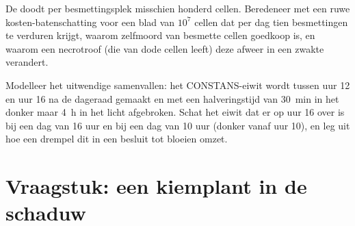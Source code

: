\begin{exercise}[$\star\star\star$]\label{exo:b3:plant-molecular-physiology:11}
De  doodt per besmettingsplek misschien honderd
cellen. Beredeneer met een ruwe kosten-batenschatting voor een blad van
$10^{7}$ cellen dat per dag tien besmettingen te verduren krijgt,
waarom zelfmoord van besmette cellen goedkoop is, en waarom een
necrotroof (die van dode cellen leeft) deze afweer in een zwakte
verandert.
\end{exercise}

\begin{exercise}[$\star\star\star$]\label{exo:b3:plant-molecular-physiology:12}
Modelleer het uitwendige samenvallen: het CONSTANS-eiwit wordt tussen
uur 12 en uur 16 na de dageraad gemaakt en met een halveringstijd van
\qty{30}{min} in het donker maar \qty{4}{h} in het licht afgebroken.
Schat het eiwit dat er op uur 16 over is bij een dag van 16 uur en bij
een dag van 10 uur (donker vanaf uur 10), en leg uit hoe een drempel
dit in een besluit tot bloeien omzet.
\end{exercise}

\section{Vraagstuk: een kiemplant in de schaduw}

